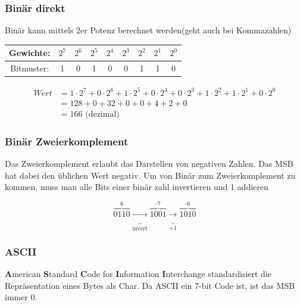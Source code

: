 \subsubsection{Binär direkt}

Binär kann mittels 2er Potenz berechnet werden(geht auch bei Kommazahlen)\newline

\noindent
\begin{tabular}{|c|c|c|c|c|c|c|c|c|}
\hline
Gewichte: & \(2^7\) & \(2^6\) & \(2^5\) & \(2^4\) & \(2^3\) & \(2^2\) & \(2^1\) & \(2^0\) \\
\hline
Bitmuster: & 1 & 0 & 1 & 0 & 0 & 1 & 1 & 0 \\
\hline
\end{tabular}

\[
\begin{aligned}
Wert &= 1 \cdot 2^7+0 \cdot 2^6+1 \cdot 2^5+0 \cdot 2^4+0 \cdot 2^3+1 \cdot 2^2+1 \cdot 2^1+0 \cdot 2^0 \\
&= 128 + 0 + 32 + 0 + 0 + 4 + 2 + 0 \\
&= 166 \text{ (dezimal)}
\end{aligned}
\]

\subsubsection{Binär Zweierkomplement}

Das Zweierkomplement erlaubt das Darstellen von negativen Zahlen. Das MSB hat dabei den üblichen Wert negativ.\newline 
Um von Binär zum Zweierkomplement zu kommen, muss man alle Bits einer binär zahl invertieren und 1 addieren

\[
\overbrace{0110}^\text{6} 
\underbrace{\rightarrow}_\text{invert} 
\overbrace{1001}^\text{-7} 
\underbrace{\rightarrow}_{+1}
\overbrace{1010}^\text{-6} 
\]
\subsubsection{ASCII}

\textbf{A}merican \textbf{S}tandard \textbf{C}ode for \textbf{I}nformation \textbf{I}nterchange standardisiert die Repräsentation eines Bytes als Char. Da ASCII ein 7-bit Code ist, ist das MSB immer 0.

